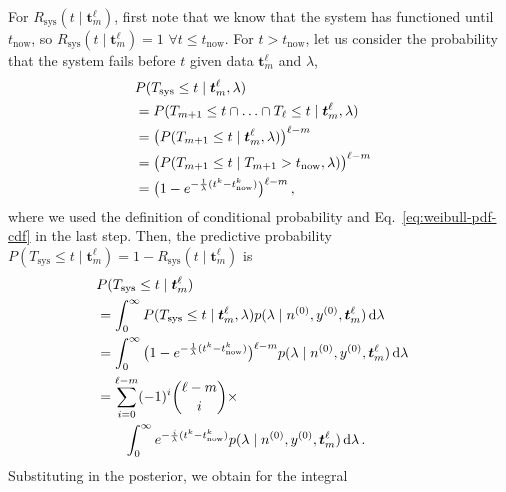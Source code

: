 \documentclass[12pt,a4paper,twocolumn,fleqn]{narms}
\newcommand{\dd}{\,\mathrm{d}}
\renewcommand{\vec}[1]{{\bm#1}}
\newcommand{\uz}{^{(0)}} %
\def\yz{y\uz}
\def\nz{n\uz}
\begin{document}
For $R_\text{sys}(t \mid \vec{t}_m^\ell)$, first note that we know that the system has functioned until $t_\text{now}$,
so $R_\text{sys}(t \mid \vec{t}_m^\ell) = 1$ $\forall t \leq t_\text{now}$.
For $t > t_\text{now}$, let us consider the probability
that the system fails before $t$ given data $\vec{t}_m^\ell$ and $\lambda$,
\begin{align}
\lefteqn{P(T_\text{sys} \leq t \mid \vec{t}_m^\ell, \lambda)} \\ 
 &= P(T_{m+1}\leq t \cap \ldots \cap T_\ell \leq t \mid \vec{t}_m^\ell, \lambda) \\
 &= \big( P(T_{m+1} \leq t \mid \vec{t}_m^\ell, \lambda) \big)^{\ell-m} \\
 &= \big( P(T_{m+1} \leq t \mid T_{m+1} > t_\text{now}, \lambda) \big)^{\ell-m} \\
 &= \big( 1 - e^{-\frac{1}{\lambda} (t^k - t_\text{now}^k)} \big)^{\ell-m}\,,
\end{align}
where we used the definition of conditional probability
and Eq.~\eqref{eq:weibull-pdf-cdf} in the last step.
%
Then, the predictive probability
$P(T_\text{sys} \leq t \mid \vec{t}_m^\ell) = 1 - R_\text{sys}(t \mid \vec{t}_m^\ell)$ is
\begin{align}
\lefteqn{P(T_\text{sys} \leq t \mid \vec{t}_m^\ell)} \\
 &= \int_0^\infty P(T_\text{sys} \leq t \mid \vec{t}_m^\ell, \lambda)
    p(\lambda \mid \nz, \yz, \vec{t}_m^\ell) \dd\lambda \\
 &= \int_0^\infty \big( 1 - e^{-\frac{1}{\lambda} (t^k - t_\text{now}^k)} \big)^{\ell-m}
    p(\lambda \mid \nz, \yz, \vec{t}_m^\ell) \dd\lambda \\
 &=\sum_{i=0}^{\ell-m} (-1)^i {\ell-m \choose i} \times \\ 
 & \qquad
    \int_0^\infty e^{-\frac{i}{\lambda} (t^k - t_\text{now}^k)}
    p(\lambda \mid \nz, \yz, \vec{t}_m^\ell) \dd\lambda \,.
\end{align}
Substituting in the posterior, we obtain for the integral
\end{document}
